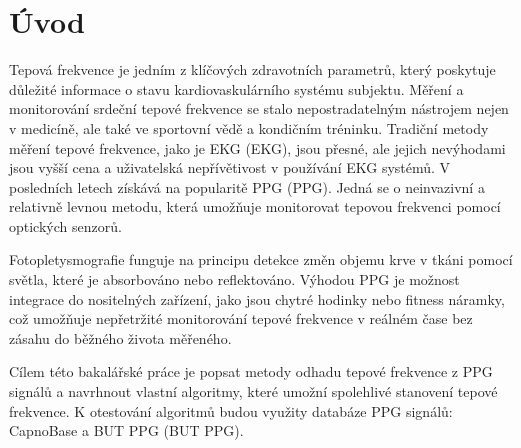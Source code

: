 \chapter*{Úvod}
{}

Tepová frekvence je jedním z klíčových zdravotních parametrů, který poskytuje důležité informace o stavu kardiovaskulárního systému subjektu.
Měření a monitorování srdeční tepové frekvence se stalo nepostradatelným nástrojem nejen v medicíně, ale také ve sportovní vědě a kondičním tréninku.
Tradiční metody měření tepové frekvence, jako je \acs{EKG} (\acl{EKG}), jsou přesné, ale jejich nevýhodami jsou vyšší cena a uživatelská nepřívětivost v používání \acs{EKG} systémů. 
V posledních letech získává na popularitě \acs{PPG} (\acl{PPG}).
Jedná se o neinvazivní a relativně levnou metodu, která umožňuje monitorovat tepovou frekvenci pomocí optických senzorů.

Fotopletysmografie funguje na principu detekce změn objemu krve v tkáni pomocí světla, které je absorbováno nebo reflektováno.
Výhodou \acs{PPG} je možnost integrace do nositelných zařízení, jako jsou chytré hodinky nebo fitness náramky, což umožňuje nepřetržité monitorování tepové frekvence v reálném čase bez zásahu do běžného života měřeného.

Cílem této bakalářské práce je popsat metody odhadu tepové frekvence z \acs{PPG} signálů a navrhnout vlastní algoritmy, které umožní spolehlivé stanovení tepové frekvence.
K otestování algoritmů budou využity databáze \acs{PPG} signálů: CapnoBase a \acs{BUT PPG} (\acl{BUT PPG}).


% 
% 
% 
